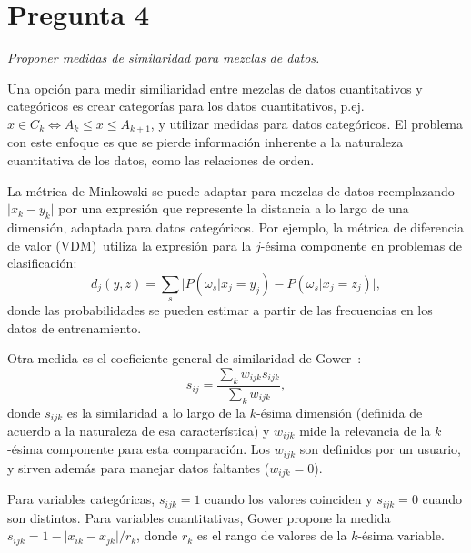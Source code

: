 \documentclass[spanish]{article}
\newcommand{\pregunta}{\textit}
\newcommand{\given}{\vert}
\newcommand{\abs}[1]{\lvert#1\rvert}
\begin{document}
\section*{Pregunta 4}
\pregunta{Proponer medidas de similaridad para mezclas de datos.}

Una opción para medir similiaridad entre mezclas de datos cuantitativos y categóricos es crear
categorías para los datos cuantitativos, p.ej. $x\in C_k\iff A_k\leq x\leq A_{k+1}$, y utilizar
medidas para datos categóricos.  El problema con este enfoque es que se pierde información
inherente a la naturaleza cuantitativa de los datos, como las relaciones de orden.

La métrica de Minkowski se puede adaptar para mezclas de datos reemplazando $\abs{x_k - y_k}$ por
una expresión que represente la distancia a lo largo de una dimensión, adaptada para datos
categóricos.  Por ejemplo, la métrica de diferencia de valor (VDM)~\footnotemark utiliza la
expresión para la $j$-ésima componente en problemas de clasificación:
\begin{equation}
    d_j(y, z) = \sum_{s}\bigl\lvert P(\omega_s\given x_j = y_j) -
                                    P(\omega_s\given x_j = z_j)\bigr\rvert,
\end{equation}
donde las probabilidades se pueden estimar a partir de las frecuencias en los datos de
entrenamiento.

Otra medida es el coeficiente general de similaridad de Gower~\footnotemark:
\begin{equation}
   s_{ij} = \frac{\sum_k w_{ijk} s_{ijk}}{\sum_k w_{ijk}},
\end{equation}
donde $s_{ijk}$ es la similaridad a lo largo de la $k$-ésima dimensión (definida
de acuerdo a la naturaleza de esa característica)
y $w_{ijk}$ mide la relevancia de la $k$-ésima componente para esta comparación.
Los $w_{ijk}$ son definidos por un usuario, y sirven además para manejar datos
faltantes ($w_{ijk} = 0$).


Para variables categóricas, $s_{ijk} = 1$ cuando los valores coinciden y $s_{ijk} = 0$ cuando son
distintos.  Para variables cuantitativas, Gower propone la medida $s_{ijk} = 1 - \lvert x_{ik} -
x_{jk}\rvert/r_k$, donde $r_k$ es el rango de valores de la $k$-ésima variable.
\end{document}
